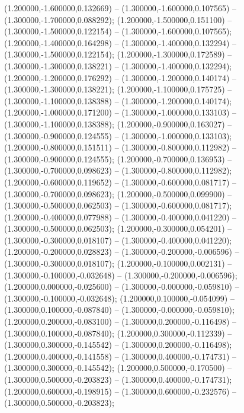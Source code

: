  (1.200000,-1.600000,0.132669) -- (1.300000,-1.600000,0.107565) -- (1.300000,-1.700000,0.088292);
 (1.200000,-1.500000,0.151100) -- (1.300000,-1.500000,0.122154) -- (1.300000,-1.600000,0.107565);
 (1.200000,-1.400000,0.164298) -- (1.300000,-1.400000,0.132294) -- (1.300000,-1.500000,0.122154);
 (1.200000,-1.300000,0.172589) -- (1.300000,-1.300000,0.138221) -- (1.300000,-1.400000,0.132294);
 (1.200000,-1.200000,0.176292) -- (1.300000,-1.200000,0.140174) -- (1.300000,-1.300000,0.138221);
 (1.200000,-1.100000,0.175725) -- (1.300000,-1.100000,0.138388) -- (1.300000,-1.200000,0.140174);
 (1.200000,-1.000000,0.171200) -- (1.300000,-1.000000,0.133103) -- (1.300000,-1.100000,0.138388);
 (1.200000,-0.900000,0.163027) -- (1.300000,-0.900000,0.124555) -- (1.300000,-1.000000,0.133103);
 (1.200000,-0.800000,0.151511) -- (1.300000,-0.800000,0.112982) -- (1.300000,-0.900000,0.124555);
 (1.200000,-0.700000,0.136953) -- (1.300000,-0.700000,0.098623) -- (1.300000,-0.800000,0.112982);
 (1.200000,-0.600000,0.119652) -- (1.300000,-0.600000,0.081717) -- (1.300000,-0.700000,0.098623);
 (1.200000,-0.500000,0.099900) -- (1.300000,-0.500000,0.062503) -- (1.300000,-0.600000,0.081717);
 (1.200000,-0.400000,0.077988) -- (1.300000,-0.400000,0.041220) -- (1.300000,-0.500000,0.062503);
 (1.200000,-0.300000,0.054201) -- (1.300000,-0.300000,0.018107) -- (1.300000,-0.400000,0.041220);
 (1.200000,-0.200000,0.028823) -- (1.300000,-0.200000,-0.006596) -- (1.300000,-0.300000,0.018107);
 (1.200000,-0.100000,0.002131) -- (1.300000,-0.100000,-0.032648) -- (1.300000,-0.200000,-0.006596);
 (1.200000,0.000000,-0.025600) -- (1.300000,-0.000000,-0.059810) -- (1.300000,-0.100000,-0.032648);
 (1.200000,0.100000,-0.054099) -- (1.300000,0.100000,-0.087840) -- (1.300000,-0.000000,-0.059810);
 (1.200000,0.200000,-0.083100) -- (1.300000,0.200000,-0.116498) -- (1.300000,0.100000,-0.087840);
 (1.200000,0.300000,-0.112339) -- (1.300000,0.300000,-0.145542) -- (1.300000,0.200000,-0.116498);
 (1.200000,0.400000,-0.141558) -- (1.300000,0.400000,-0.174731) -- (1.300000,0.300000,-0.145542);
 (1.200000,0.500000,-0.170500) -- (1.300000,0.500000,-0.203823) -- (1.300000,0.400000,-0.174731);
 (1.200000,0.600000,-0.198915) -- (1.300000,0.600000,-0.232576) -- (1.300000,0.500000,-0.203823);
